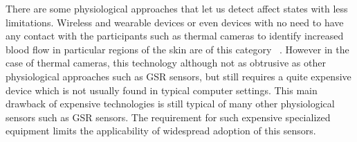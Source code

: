 There are some physiological approaches that let us detect affect states with less limitations. Wireless and wearable devices or even devices with no need to have any contact with the participants such as thermal cameras to identify increased blood flow in particular regions of the skin are of this category ~\cite{puri2005stresscam}. However in the case of thermal cameras, this technology although not as obtrusive as other physiological approaches such as GSR sensors, but still requires a quite expensive device which is not usually found in typical computer settings. This main drawback of expensive technologies is still typical of many other physiological sensors such as GSR sensors. The requirement for such expensive specialized equipment limits the applicability of widespread adoption of this sensors.
